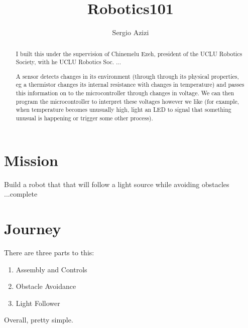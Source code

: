 \documentclass[final,3p,times,twocolumn]{elsarticle}
\begin{document}
\begin{frontmatter}

\title{Robotics101}

\author{Sergio Azizi}

\begin{abstract}
I built this under the supervision of Chinemelu Ezeh, president of the UCLU Robotics Society, with he UCLU Robotics Soc.
...\par
A sensor detects changes in its environment (through through its physical properties, eg a thermistor changes its internal resistance with changes in temperature) and passes this information on to the microcontroller through changes in voltage.
We can then program the microcontroller to interpret these voltages however we like (for example, when temperature becomes unusually high, light an LED to signal that something unusual is happening or trigger some other process).

\end{abstract}

\end{frontmatter}


\section{Mission}
Build a robot that that will follow a light source while avoiding obstacles
...complete


\section{Journey}
There are three parts to this:
\begin{enumerate}
\item Assembly and Controls
\item Obstacle Avoidance
\item Light Follower
\end{enumerate}
Overall, pretty simple.
\end{document}
